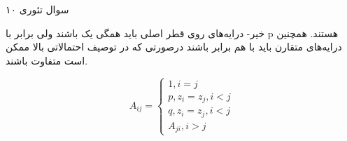 سوال تئوری ۱۰

خیر-
درایه‌های روی قطر اصلی باید همگی یک باشند ولی برابر با p هستند.
همچنین درایه‌های متقارن باید با هم برابر باشند درصورتی که در توصیف احتمالاتی بالا ممکن است متفاوت باشند.

$$
A_{ij}=\begin{cases}1, i=j\\ p, z_{i} = z_{j}, i<j\\ q, z_{i} = z_{j}, i<j\\ A_{ji}, i>j\end{cases}
$$